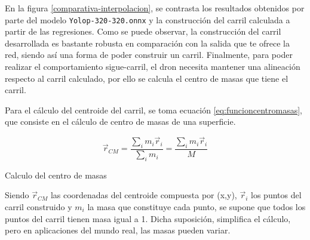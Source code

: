 En la figura \ref{comparativa-interpolacion}, se contrasta los resultados obtenidos por parte del modelo \texttt{Yolop-320-320.onnx} y la construcción del carril calculada a partir de las regresiones. 
Como se puede observar, la construcción del carril desarrollada es bastante robusta en comparación con la salida que te ofrece la red, siendo así una forma de poder construir un 
carril. Finalmente, para poder realizar el comportamiento sigue-carril, el dron necesita mantener una alineación respecto al carril calculado, por ello 
se calcula el centro de masas que tiene el carril.

Para el cálculo del centroide del carril, se toma ecuación \ref{eq:funcioncentromasas}, que consiste en el cálculo de centro de masas de una superficie. 
  \begin{myequation}[h]
    \begin{equation} 
      \vec{r}_{CM} = \frac{\sum_{i}m_{i} \vec{r}_{i}}{\sum_{i}m_{i}} = \frac{\sum_{i}m_{i} \vec{r}_{i}}{M} 
      \label{eq:funcioncentromasas}
    \end{equation} 
    \caption{Calculo del centro de masas}
    \vspace{-1.5em}
  \end{myequation}

  Siendo $\vec{r}_{CM}$ las coordenadas del centroide compuesta por (x,y), $\vec{r}_{i}$ los puntos del carril construido y $m_{i}$ la masa que constituye cada punto, se supone que todos 
  los puntos del carril tienen masa igual a 1. Dicha suposición, simplifica el cálculo, pero en aplicaciones del mundo real, las masas pueden variar. 

